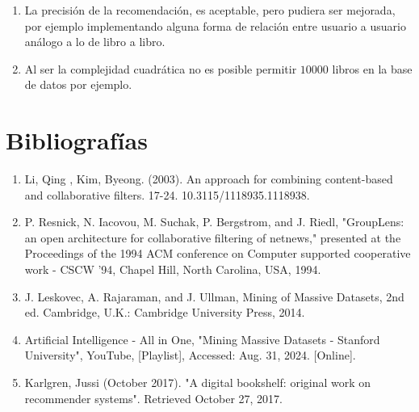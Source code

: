 \documentclass[14pt]{extarticle}
\begin{document}
\begin{enumerate}
    \item La precisión de la recomendación, es aceptable, pero pudiera ser mejorada, por ejemplo implementando alguna forma de relación entre usuario a usuario análogo a lo de libro a libro.
    \item Al ser la complejidad cuadrática no es posible permitir $10000$ libros en la base de datos por ejemplo.
\end{enumerate}



\section{Bibliografías}

\begin{enumerate}
    \item Li, Qing , Kim, Byeong. (2003). An approach for combining content-based and collaborative filters. 17-24. 10.3115/1118935.1118938. 
    \item P. Resnick, N. Iacovou, M. Suchak, P. Bergstrom, and J. Riedl, "GroupLens: an open architecture for collaborative filtering of netnews," presented at the Proceedings of the 1994 ACM conference on Computer supported cooperative work - CSCW '94, Chapel Hill, North Carolina, USA, 1994.
    \item J. Leskovec, A. Rajaraman, and J. Ullman, Mining of Massive Datasets, 2nd ed. Cambridge, U.K.: Cambridge University Press, 2014.
    \item Artificial Intelligence - All in One, "Mining Massive Datasets - Stanford University", YouTube, [Playlist], Accessed: Aug. 31, 2024. [Online]. 
    \item Karlgren, Jussi (October 2017). "A digital bookshelf: original work on recommender systems". Retrieved October 27, 2017.
\end{enumerate}
\end{document}
